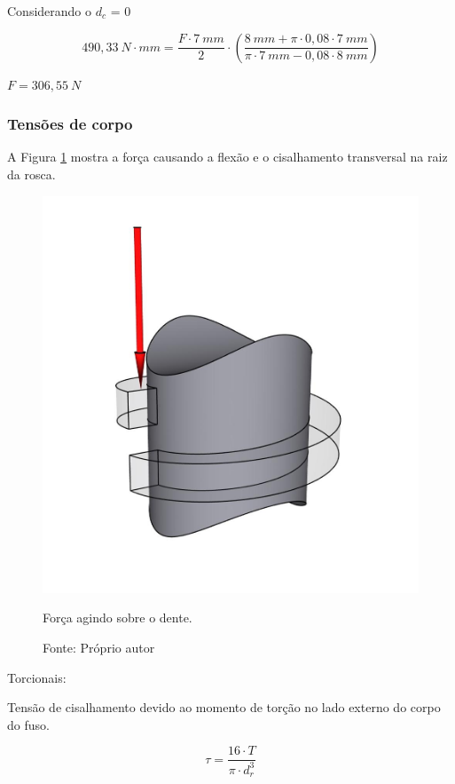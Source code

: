 Considerando o $d_{c}$ = 0

$$490,33~N \cdot mm = \frac{F \cdot 7~mm}{2} \cdot (\frac{8~mm + \pi \cdot 0,08 \cdot 7~mm}{\pi \cdot 7~mm - 0,08 \cdot 8~mm})$$

$F = 306,55~N$

\subsubsection{Tensões de corpo}

A Figura \ref{fig:forcadente} mostra a força causando a flexão e o cisalhamento transversal na raiz da rosca.

\begin{figure}[H]
\centering
\includegraphics[scale = 0.2]{figuras/forcadente}
\caption{Força agindo sobre o dente.}
\caption*{Fonte: Próprio autor}
\label{fig:forcadente}
\end{figure}

Torcionais:

Tensão de cisalhamento devido ao momento de torção no lado externo do corpo do fuso.

\begin{equation}\label{eq:tensaocilhamento}
\tau = \frac{16 \cdot T}{\pi \cdot d_{r}^{3}}
\end{equation}

